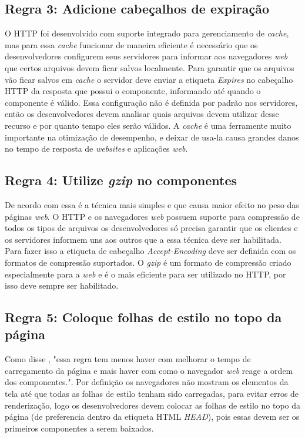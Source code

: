 \subsection{Regra 3: Adicione cabeçalhos de expiração}
\label{subsec:highperformance_regra3}
O HTTP foi desenvolvido com suporte integrado para gerenciamento de \textit{cache}, mas para essa \textit{cache} funcionar de maneira eficiente é necessário que os desenvolvedores configurem seus servidores para informar aos navegadores \textit{web} que certos arquivos devem ficar salvos localmente. Para garantir que os arquivos vão ficar salvos em \textit{cache} o servidor deve enviar a etiqueta \textit{Expires} no cabeçalho HTTP da resposta que possui o componente, informando até quando o componente é válido. Essa configuração não é definida por padrão nos servidores, então os desenvolvedores devem analisar quais arquivos devem utilizar desse recurso e por quanto tempo eles serão válidos. A \textit{cache} é uma ferramente muito importante na otimização de desempenho, e deixar de usa-la causa grandes danos no tempo de resposta de \textit{websites} e aplicações \textit{web}.

\subsection{Regra 4: Utilize \textit{gzip} no componentes}
\label{subsec:highperformance_regra4}
De acordo com  essa é a técnica mais simples e que causa maior efeito no peso das páginas \textit{web}. O HTTP e os navegadores \textit{web} possuem suporte para compressão de todos os tipos de arquivos os desenvolvedores só precisa garantir que os clientes e os servidores informem uns aos outros que a essa técnica deve ser habilitada. Para fazer isso a etiqueta de cabeçalho \textit{Accept-Encoding} deve ser definida com os formatos de compressão suportados. O \textit{gzip} é um formato de compressão criado especialmente para a \textit{web} e é o mais eficiente para ser utilizado no HTTP, por isso deve sempre ser habilitado.

\subsection{Regra 5: Coloque folhas de estilo no topo da página}
\label{subsec:highperformance_regra5}
Como disse , "essa regra tem menos haver com melhorar o tempo de carregamento da página e mais haver com como o navegador \textit{web} reage a ordem dos componentes.". Por definição os navegadores não mostram os elementos da tela até que todas as folhas de estilo tenham sido carregadas, para evitar erros de renderização, logo os desenvolvedores devem colocar as folhas de estilo no topo da página (de preferencia dentro da etiqueta HTML \textit{HEAD}), pois essas devem ser os primeiros componentes a serem baixados.

